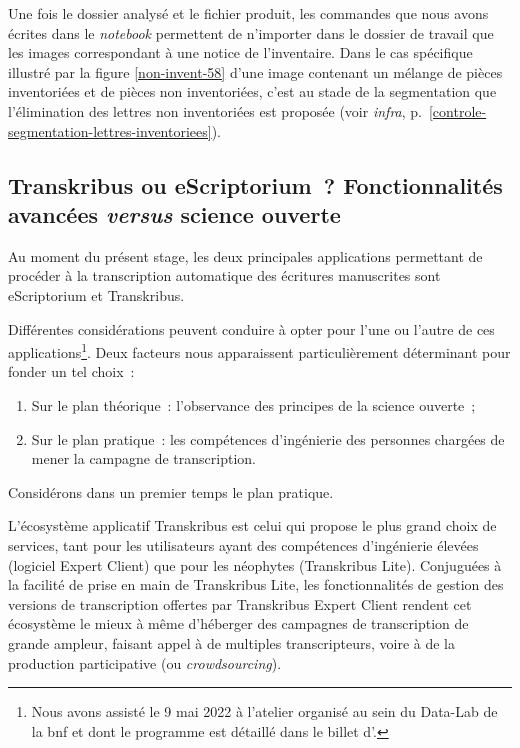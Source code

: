 \documentclass[a4paper,12pt,twoside]{book}
\begin{document}
				Une fois le dossier analysé et le fichier produit, les commandes que nous avons écrites dans le \textit{notebook} permettent de n'importer dans le dossier de travail que les images correspondant à une notice de l'inventaire. Dans le cas spécifique illustré par la figure \ref{non-invent-58} d'une image contenant un mélange de pièces inventoriées et de pièces non inventoriées, c'est au stade de la segmentation que l'élimination des lettres non inventoriées est proposée (voir \textit{infra}, p.~\ref{controle-segmentation-lettres-inventoriees}).
							
			\subsection[Transkribus ou eScriptorium~?]{Transkribus ou eScriptorium~? Fonctionnalités avancées \textit{versus} science ouverte}
				Au moment du présent stage, les deux principales applications permettant de procéder à la transcription automatique des écritures manuscrites sont eScriptorium et Transkribus.
				
				Différentes considérations peuvent conduire à opter pour l'une ou l'autre de ces applications\footnote{Nous avons assisté le 9 mai 2022 à l'atelier organisé au sein du Data-Lab de la \gls{bnf} et dont le programme est détaillé dans le billet d'\cite{jacquotTranskribusEScriptoriumTranscrire}.}. Deux facteurs nous apparaissent particulièrement déterminant pour fonder un tel choix~:
				
				\begin{enumerate}
					\item Sur le plan théorique~: l'observance des principes de la science ouverte~;
					\item Sur le plan pratique~: les compétences d'ingénierie des personnes chargées de mener la campagne de transcription.
				\end{enumerate}
				
				Considérons dans un premier temps le plan pratique.
				
				L'écosystème applicatif Transkribus est celui qui propose le plus grand choix de services, tant pour les utilisateurs ayant des compétences d'ingénierie élevées (logiciel Expert Client) que pour les néophytes (Transkribus Lite). Conjuguées à la facilité de prise en main de Transkribus Lite, les fonctionnalités de gestion des versions de transcription offertes par Transkribus Expert Client rendent cet écosystème le mieux à même d'héberger des campagnes de transcription de grande ampleur, faisant appel à de multiples transcripteurs, voire à de la production participative (ou \textit{crowdsourcing}).
				
\end{document}
